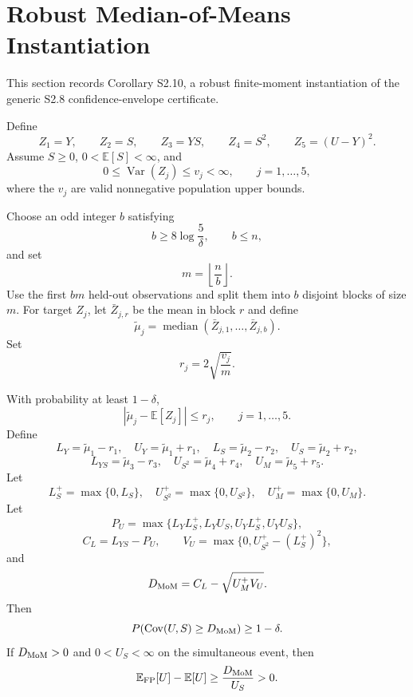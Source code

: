 \section{Robust Median-of-Means Instantiation}

This section records Corollary S2.10, a robust finite-moment instantiation of the generic S2.8 confidence-envelope certificate.

Define
\[
Z_1=Y,
\qquad
Z_2=S,
\qquad
Z_3=YS,
\qquad
Z_4=S^2,
\qquad
Z_5=(U-Y)^2.
\]
Assume $S\ge0$, $0<\mathbb E[S]<\infty$, and
\[
0\le \operatorname{Var}(Z_j)\le v_j<\infty,
\qquad j=1,\ldots,5,
\]
where the $v_j$ are valid nonnegative population upper bounds.

Choose an odd integer $b$ satisfying
\[
b\ge8\log\frac{5}{\delta},
\qquad
b\le n,
\]
and set
\[
m=\left\lfloor\frac{n}{b}\right\rfloor.
\]
Use the first $bm$ held-out observations and split them into $b$ disjoint blocks of size $m$. For target $Z_j$, let $\bar Z_{j,r}$ be the mean in block $r$ and define
\[
\widetilde\mu_j
=
\operatorname{median}
\left(
\bar Z_{j,1},\ldots,\bar Z_{j,b}
\right).
\]
Set
\[
r_j=2\sqrt{\frac{v_j}{m}}.
\]

\begin{corollary}
With probability at least $1-\delta$,
\[
|\widetilde\mu_j-\mathbb E[Z_j]|
\le r_j,
\qquad
j=1,\ldots,5.
\]
Define
\[
L_Y=\widetilde\mu_1-r_1,
\quad U_Y=\widetilde\mu_1+r_1,
\quad
L_S=\widetilde\mu_2-r_2,
\quad U_S=\widetilde\mu_2+r_2,
\]
\[
L_{YS}=\widetilde\mu_3-r_3,
\quad
U_{S^2}=\widetilde\mu_4+r_4,
\quad
U_M=\widetilde\mu_5+r_5.
\]
Let
\[
L_S^+=\max\{0,L_S\},
\quad
U_{S^2}^+=\max\{0,U_{S^2}\},
\quad
U_M^+=\max\{0,U_M\}.
\]
Let
\[
P_U=
\max\{L_YL_S^+,L_YU_S,U_YL_S^+,U_YU_S\},
\]
\[
C_L=L_{YS}-P_U,
\qquad
V_U=\max\{0,U_{S^2}^+-(L_S^+)^2\},
\]
and
\[
D_{\rm MoM}=C_L-\sqrt{U_M^+V_U}.
\]
Then
\[
P\!\left(
\operatorname{Cov}(U,S)\ge D_{\rm MoM}
\right)
\ge1-\delta.
\]
If $D_{\rm MoM}>0$ and $0<U_S<\infty$ on the simultaneous event, then
\[
\mathbb E_{\rm FP}[U]-\mathbb E[U]
\ge
\frac{D_{\rm MoM}}{U_S}>0.
\]
\end{corollary}

